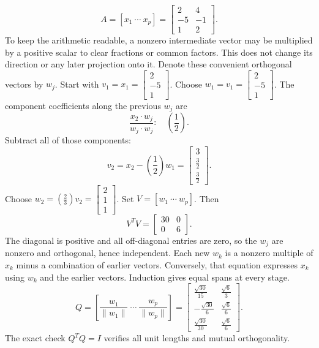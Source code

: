 \[A=[x_1\ \cdots\ x_p]=\left[\begin{array}{rr}2&4\\-5&-1\\1&2\end{array}\right].\]
To keep the arithmetic readable, a nonzero intermediate vector may be multiplied by a positive scalar to clear fractions or common factors. This does not change its direction or any later projection onto it. Denote these convenient orthogonal vectors by $w_j$.
Start with $v_1=x_1=\left[\begin{array}{r}2\\-5\\1\end{array}\right]$.
Choose $w_{1}=v_{1}=\left[\begin{array}{r}2\\-5\\1\end{array}\right]$.
The component coefficients along the previous $w_j$ are
\[\frac{x_{2}\cdot w_j}{w_j\cdot w_j}:\quad(\frac{1}{2}).\]
Subtract all of those components:
\[v_{2}=x_{2}-(\frac{1}{2})w_{1}=\left[\begin{array}{r}3\\\frac{3}{2}\\\frac{3}{2}\end{array}\right].\]
Choose $w_{2}=(\frac{2}{3})v_{2}=\left[\begin{array}{r}2\\1\\1\end{array}\right]$.
Set $V=[w_1\ \cdots\ w_p]$. Then
\[V^TV=\left[\begin{array}{rr}30&0\\0&6\end{array}\right].\]
The diagonal is positive and all off-diagonal entries are zero, so the $w_j$ are nonzero and orthogonal, hence independent. Each new $w_k$ is a nonzero multiple of $x_k$ minus a combination of earlier vectors. Conversely, that equation expresses $x_k$ using $w_k$ and the earlier vectors. Induction gives equal spans at every stage.
\[Q=\left[\frac{w_1}{\|w_1\|}\ \cdots\ \frac{w_p}{\|w_p\|}\right]=\left[\begin{array}{rr}\frac{\sqrt{30}}{15}&\frac{\sqrt{6}}{3}\\- \frac{\sqrt{30}}{6}&\frac{\sqrt{6}}{6}\\\frac{\sqrt{30}}{30}&\frac{\sqrt{6}}{6}\end{array}\right].\]
The exact check $Q^TQ=I$ verifies all unit lengths and mutual orthogonality.

